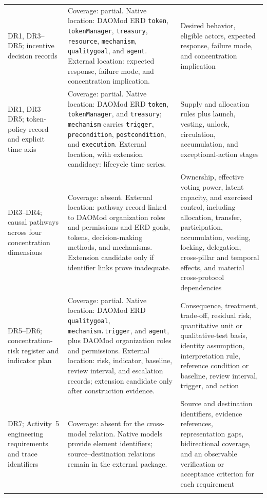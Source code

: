 \documentclass[referee,sn-basic]{sn-jnl}
\begin{document}
{\begin{longtable}{@{}p{.27\linewidth}p{.31\linewidth}p{.35\linewidth}@{}}
DR1, DR3--DR5; incentive decision records & Coverage: partial. Native location: DAOMod ERD \texttt{token}, \texttt{tokenManager}, \texttt{treasury}, \texttt{resource}, \texttt{mechanism}, \texttt{qualitygoal}, and \texttt{agent}. External location: expected response, failure mode, and concentration implication. & Desired behavior, eligible actors, expected response, failure mode, and concentration implication \\
DR1, DR3--DR5; token-policy record and explicit time axis & Coverage: partial. Native location: DAOMod ERD \texttt{token}, \texttt{tokenManager}, and \texttt{treasury}; \texttt{mechanism} carries \texttt{trigger}, \texttt{precondition}, \texttt{postcondition}, and \texttt{execution}. External location, with extension candidacy: lifecycle time series. & Supply and allocation rules plus launch, vesting, unlock, circulation, accumulation, and exceptional-action stages \\
DR3--DR4; causal pathways across four concentration dimensions & Coverage: absent. External location: pathway record linked to DAOMod organization roles and permissions and ERD goals, tokens, decision-making methods, and mechanisms. Extension candidate only if identifier links prove inadequate. & Ownership, effective voting power, latent capacity, and exercised control, including allocation, transfer, participation, accumulation, vesting, locking, delegation, cross-pillar and temporal effects, and material cross-protocol dependencies \\
DR5--DR6; concentration-risk register and indicator plan & Coverage: partial. Native location: DAOMod ERD \texttt{qualitygoal}, \texttt{mechanism.trigger}, and \texttt{agent}, plus DAOMod organization roles and permissions. External location: risk, indicator, baseline, review interval, and escalation records; extension candidate only after construction evidence. & Consequence, treatment, trade-off, residual risk, quantitative unit or qualitative-test basis, identity assumption, interpretation rule, reference condition or baseline, review interval, trigger, and action \\
DR7; Activity~5 engineering requirements and trace identifiers & Coverage: absent for the cross-model relation. Native models provide element identifiers; source--destination relations remain in the external package. & Source and destination identifiers, evidence references, representation gaps, bidirectional coverage, and an observable verification or acceptance criterion for each requirement \\
\botrule
\end{longtable}
}
\end{document}
